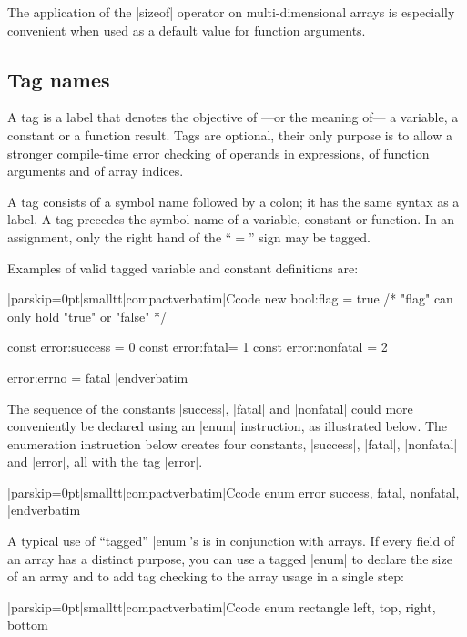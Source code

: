 \noindent{}%
The application of the |sizeof| operator on multi-dimensional arrays is
especially convenient when used as a default value for function arguments.


\subsection{Tag names}
 
A tag is a label that denotes the objective of ---or the meaning of--- a
variable, a constant or a function result. Tags are optional, their only
purpose is to allow a stronger compile-time error checking of operands in
expressions, of function arguments and of array indices.

\noindent{}%
A tag consists of a symbol name followed by a colon; it has the same
syntax as a label. A tag precedes the symbol name of a variable, constant
or function. In an assignment, only the right hand of the ``$=$'' sign may be
tagged.

Examples of valid tagged variable and constant definitions are:

\listingx\verbatim|parskip=0pt|smalltt|compactverbatim|Ccode
new bool:flag = true        /* "flag" can only hold "true" or "false" */

const error:success = 0
const error:fatal= 1
const error:nonfatal = 2

error:errno = fatal
|endverbatim\endlistingx

\noindent{}%
The sequence of the constants |success|, |fatal| and |nonfatal| could more
conveniently be declared using an |enum| instruction, as illustrated below. The
enumeration instruction below creates four constants, |success|, |fatal|,
|nonfatal| and |error|, all with the tag |error|.

\listingx\verbatim|parskip=0pt|smalltt|compactverbatim|Ccode
enum error {
    success,
    fatal,
    nonfatal,
}
|endverbatim\endlistingx

A typical use of ``tagged'' |enum|'s is in conjunction with arrays. If every
field of an array has a distinct purpose, you can use a tagged |enum| to
declare the size of an array and to add tag checking to the array usage
in a single step:

\listingx\verbatim|parskip=0pt|smalltt|compactverbatim|Ccode
enum rectangle
    {
    left,
    top,
    right,
    bottom
    }

